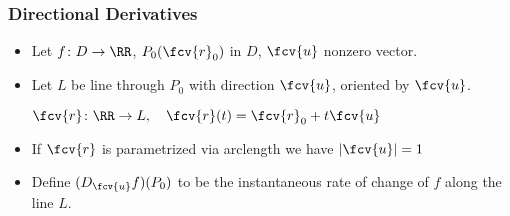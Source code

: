 \begin{frame}
  \frametitle{Directional Derivatives}
\begin{itemize}
\item  Let $f \colon D \to \RR$, $P_0(\fcv{r}_0)$ in $D$, $\fcv{u}$ nonzero vector.
\item<2-> Let $L$ be line through $P_0$ with direction $\fcv{u}$, \alert<1->{oriented} by $\fcv{u}$.

\hfil{} $\fcv{r}\colon \RR \to L, \quad \fcv{r}(t) = \fcv{r}_0+t\fcv{u}$

\item<4-> If $\fcv{r}$ is parametrized via arclength we have $|\fcv{u}|=1$
\item<6-> Define $(D_{\fcv{u}} f)(P_0)$ to be the instantaneous rate of change of $f$ along the line $L$.
\end{itemize}
\end{frame}